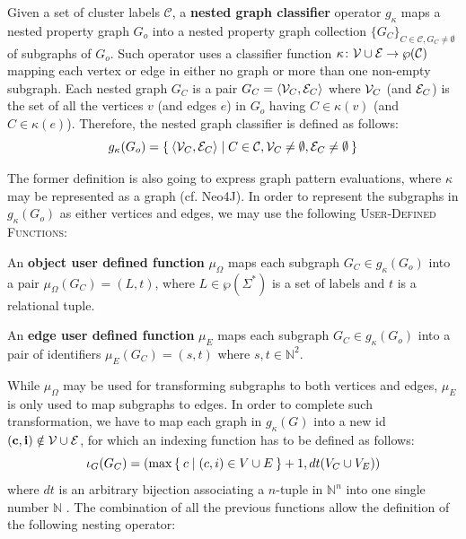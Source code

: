 \begin{definition}
	Given a set of cluster labels $\mathcal{C}$, a \textbf{nested graph classifier} operator $g_\kappa$ maps a nested property graph $G_o$ into a nested property graph collection $\{G_C\}_{C\in\mathcal{C},G_C\neq \emptyset}$ of subgraphs of $G_o$. Such operator uses a classifier function $\kappa\colon \mathcal{V}\cup \mathcal{E}\to \wp(\mathcal{C})$ mapping each vertex or edge in either no graph or more than one non-empty subgraph. Each nested graph $G_C$ is a pair
	$G_C=\Braket{\mathcal{V}_C,\mathcal{E}_C}$
	where $\mathcal{V}_C$ (and $\mathcal{E}_C$) is the set of all the vertices $v$ (and edges $e$) in $G_o$ having $C\in \kappa(v)$ (and $C\in \kappa(e)$). Therefore, the nested graph classifier is defined as follows:
	\[g_\kappa(G_o)=\Set{\Braket{\mathcal{V}_C,\mathcal{E}_C}|C\in\mathcal{C},\mathcal{V}_C\neq\emptyset,\mathcal{E}_C\neq\emptyset}\]
\end{definition}

The former definition is also going to express graph pattern evaluations, where $\kappa$ may be represented as a graph (cf. Neo4J). In order to represent the subgraphs in $g_\kappa(G_o)$ as either vertices and edges, we may use
the following \textsc{User-Defined Functions}:
\begin{definition}
	An \textbf{object user defined function} $\mu_\Omega$ maps each subgraph $G_C\in g_\kappa(G_o)$ into a pair $\mu_\Omega(G_C)=(L,t)$, where $L\in\wp(\Sigma^*)$ is a set of labels and $t$ is a relational tuple.
	
	An \textbf{edge user defined function} $\mu_E$ maps each subgraph $G_C\in g_\kappa(G_o)$ into a pair of identifiers $\mu_E(G_C)=(s,t)$ where $s,t\in\mathbb{N}^2$.
\end{definition}

While $\mu_\Omega$ may be used for transforming subgraphs to both vertices and edges, $\mu_E$ is only used to map subgraphs to edges. In order to complete such transformation,  we have to map each graph in $g_\kappa(G)$ into a new id $(\textbf{c},\textbf{i})\notin \mathcal{V}\cup \mathcal{E}$, for which an indexing function has to be defined as follows:
\[\iota_G(G_C)=(\max\Set{c|(c,i)\in V\cup E}+1,dt(V_C\cup V_E))\]
where $dt$ is an arbitrary bijection associating a  $n$-tuple in $\mathbb{N}^n$ into one single number $\mathbb{N}$ \cite{odifreddi1992}. The combination of all the previous functions allow the definition of the following nesting operator:



